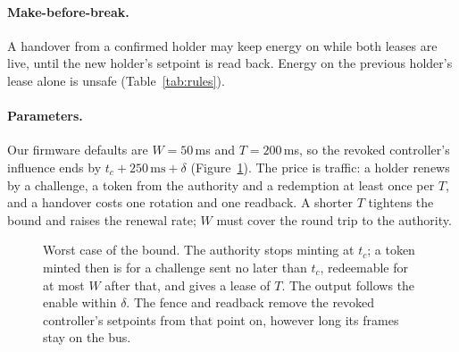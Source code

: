 \documentclass[letterpaper]{article} %
\begin{document}
\paragraph{Make-before-break.} A handover from a confirmed holder may keep energy on while both
leases are live, until the new holder's setpoint is read back. Energy on the previous holder's
lease alone is unsafe (Table~\ref{tab:rules}).

\paragraph{Parameters.} Our firmware defaults are $W = 50$\,ms and $T = 200$\,ms, so the revoked
controller's influence ends by $t_c + 250\,\text{ms} + \delta$ (Figure~\ref{fig:timeline}). The
price is traffic: a holder renews by a challenge, a token from the authority and a redemption at
least once per $T$, and a handover costs one rotation and one readback. A shorter $T$ tightens the
bound and raises the renewal rate; $W$ must cover the round trip to the authority.

\begin{figure}[t]
\centering
{}
\caption{Worst case of the bound. The authority stops minting at $t_c$; a token minted then is
for a challenge sent no later than $t_c$, redeemable for at most $W$ after that, and gives a lease
of $T$. The output follows the enable within $\delta$. The fence and readback remove the revoked
controller's setpoints from that point on, however long its frames stay on the bus.}
\label{fig:timeline}
\end{figure}
\end{document}
